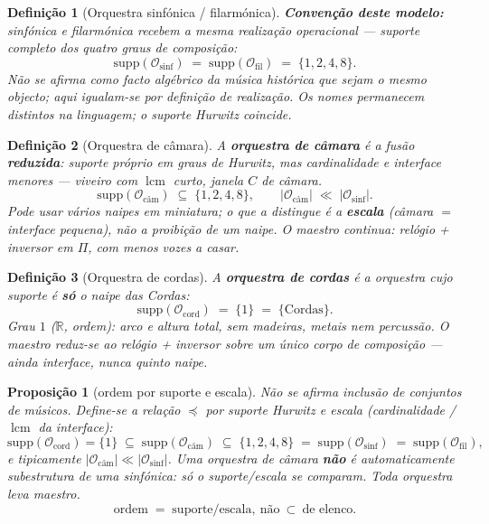 \documentclass[11pt,a4paper]{article}
\newtheorem{definicao}{Definição}
\newtheorem{proposicao}{Proposição}
\begin{document}
\begin{definicao}[Orquestra sinfónica / filarmónica]\label{def:sinfonica}
\textbf{Convenção deste modelo:} sinfónica e filarmónica recebem a
\emph{mesma} realização operacional --- suporte completo dos quatro
graus de composição:
\[
\mathrm{supp}(\mathcal{O}_{\mathrm{sinf}})
\;=\;
\mathrm{supp}(\mathcal{O}_{\mathrm{fil}})
\;=\;
\{1,2,4,8\}.
\]
Não se afirma como facto algébrico da música histórica que sejam o
mesmo objecto; aqui igualam-se por definição de realização. Os nomes
permanecem distintos na linguagem; o suporte Hurwitz coincide.
\end{definicao}

\begin{definicao}[Orquestra de câmara]\label{def:camara}
A \textbf{orquestra de câmara} é a fusão \textbf{reduzida}: suporte
próprio em graus de Hurwitz, mas cardinalidade e interface menores
--- viveiro com $\operatorname{lcm}$ curto, janela $C$ de câmara.
\[
\mathrm{supp}(\mathcal{O}_{\mathrm{câm}})
\;\subseteq\;
\{1,2,4,8\},
\qquad
|\mathcal{O}_{\mathrm{câm}}|
\;\ll\;
|\mathcal{O}_{\mathrm{sinf}}|.
\]
Pode usar vários naipes em miniatura; o que a distingue é a
\textbf{escala} (câmara $=$ interface pequena), não a proibição de um
naipe. O maestro continua: relógio + inversor em $\Pi$, com menos
vozes a casar.
\end{definicao}

\begin{definicao}[Orquestra de cordas]\label{def:orq-cordas}
A \textbf{orquestra de cordas} é a orquestra cujo suporte é
\textbf{só} o naipe das Cordas:
\[
\mathrm{supp}(\mathcal{O}_{\mathrm{cord}})
\;=\;
\{1\}
\;=\;
\{\text{Cordas}\}.
\]
Grau $1$ ($\mathbb{R}$, ordem): arco e altura total, sem madeiras,
metais nem percussão. O maestro reduz-se ao relógio + inversor sobre
um único corpo de composição --- ainda interface, nunca quinto naipe.
\end{definicao}

\begin{proposicao}[ordem por suporte e escala]\label{prop:orq-hier}
Não se afirma inclusão de conjuntos de músicos. Define-se a relação
$\preceq$ por suporte Hurwitz e escala (cardinalidade / $\operatorname{lcm}$
da interface):
\[
\mathrm{supp}(\mathcal{O}_{\mathrm{cord}})=\{1\}
\;\subseteq\;
\mathrm{supp}(\mathcal{O}_{\mathrm{câm}})
\;\subseteq\;
\{1,2,4,8\}
\;=\;
\mathrm{supp}(\mathcal{O}_{\mathrm{sinf}})
\;=\;
\mathrm{supp}(\mathcal{O}_{\mathrm{fil}}),
\]
e tipicamente $|\mathcal{O}_{\mathrm{câm}}|\ll|\mathcal{O}_{\mathrm{sinf}}|$.
Uma orquestra de câmara \textbf{não} é automaticamente subestrutura
de uma sinfónica: só o suporte/escala se comparam. Toda orquestra leva
maestro.
\[
\boxed{
\text{ordem}\;=\;\text{suporte/escala},\ \text{não}\ \subset\ \text{de elenco}.
}
\]
\end{proposicao}
\end{document}
